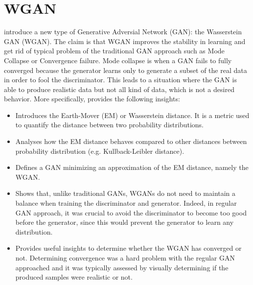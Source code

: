 \documentclass[11pt,a4paper,twoside]{report}
\begin{document}





\section{WGAN}

\cite{arjovsky2017wasserstein} introduce a new type of Generative Adversial Network (GAN): the Wasserstein GAN (WGAN). The claim is that WGAN improves the stability in learning and get rid of typical problem of the traditional GAN approach such as Mode Collapse or Convergence failure. Mode collapse is when a GAN fails to fully converged because the generator learns only to generate a subset of the real data in order to fool the discriminator. This leads to a situation where the GAN is able to produce realistic data but not all kind of data, which is not a desired behavior. More specifically, \cite{arjovsky2017wasserstein} provides the following insights:

\begin{itemize}
    \item Introduces the Earth-Mover (EM) or Wasserstein distance. It is a metric used to quantify the distance between two probability distributions.
    \item Analyses how the EM distance behaves compared to other distances between probability distribution (e.g. Kullback-Leibler distance).
    \item Defines a GAN minimizing an approximation of the EM distance, namely the WGAN.
    \item Shows that, unlike traditional GANs, WGANs do not need to maintain a balance when training the discriminator and generator. Indeed, in regular GAN approach, it was crucial to avoid the discriminator to become too good before the generator, since this would prevent the generator to learn any distribution.
    \item Provides useful insights to determine whether the WGAN has converged or not. Determining convergence was a hard problem with the regular GAN approached and it was typically assessed by visually determining if the produced samples were realistic or not.
\end{itemize}
\end{document}

